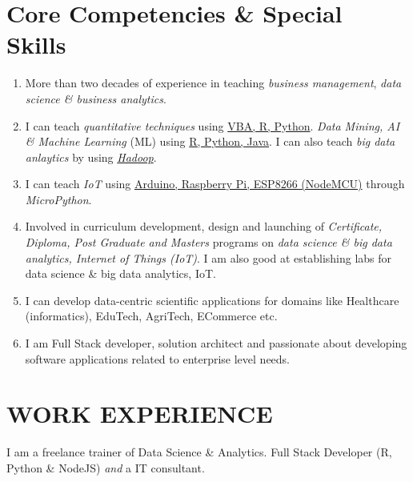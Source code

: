 \documentclass[10pt]{article}
\begin{document}
\section{Core Competencies \& Special Skills} \hline \vspace{0.5cm}

\begin{enumerate}
	\item More than two decades of experience in teaching \emph{business management}, \emph{data science \& business analytics}.
	\item I can teach \emph{quantitative techniques} using \underline{VBA, R, Python}. \emph{Data Mining, AI \& Machine Learning} (ML) using \underline{R, Python, Java}. I can also teach \emph{big data anlaytics} by using \underline{\emph{Hadoop}}. 
	\item I can teach \emph{IoT} using \underline{Arduino, Raspberry Pi, ESP8266 (NodeMCU)} through \emph{MicroPython}. 
	\item Involved in curriculum development, design and launching of \emph{Certificate, Diploma, Post Graduate and Masters} programs on \emph{data science \& big data analytics, Internet of Things (IoT)}. I am also good at establishing labs for data science \& big data analytics, IoT.
	
	\item I can develop data-centric scientific applications for domains like Healthcare (informatics), EduTech, AgriTech, ECommerce etc. 
	\item I am {Full Stack} developer, solution architect and passionate about developing software applications related to enterprise level needs. 
	
\end{enumerate}
	
\newpage
\section{WORK EXPERIENCE} \hline \vspace{0.5cm}



 I am a freelance trainer of Data Science \& Analytics. Full Stack Developer (R, Python \& NodeJS) \emph{and} a IT consultant.  
\end{document}
